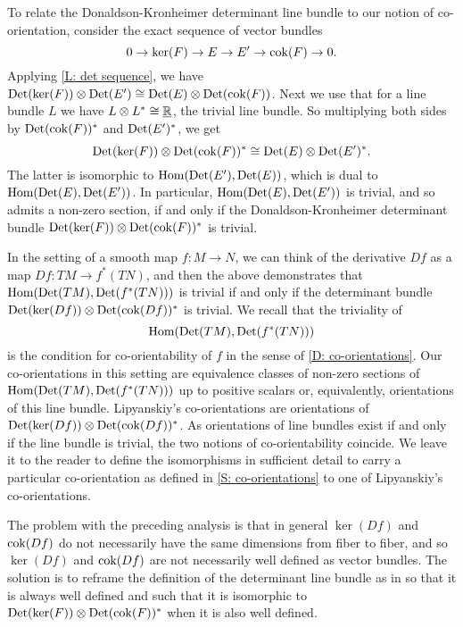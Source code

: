 To relate the Donaldson-Kronheimer determinant line bundle to our notion of co-orientation, consider the exact sequence of vector bundles
\begin{equation*}
	0 \to \ker(F) \to E \to E' \to {\rm cok}(F) \to 0.
\end{equation*}
Applying \cref{L: det sequence}, we have ${\rm Det}(\ker(F)) \otimes {\rm Det}(E') \cong {\rm Det}(E) \otimes {\rm Det}({\rm cok}(F))$.
Next we use that for a line bundle $L$ we have $L \otimes L^* \cong \underline{\mathbb{R}}$, the trivial line bundle.
So multiplying both sides by ${\rm Det}({\rm cok}(F))^*$ and ${\rm Det}(E')^*$, we get
$${\rm Det}(\ker(F)) \otimes {\rm Det}({\rm cok}(F))^* \cong {\rm Det}(E) \otimes {\rm Det}(E')^*.$$
The latter is isomorphic to $\textup{Hom}({\rm Det}(E'), {\rm Det}(E))$, which is dual to $\textup{Hom}({\rm Det}(E), {\rm Det}(E'))$.
In particular, $\textup{Hom}({\rm Det}(E), {\rm Det}(E'))$ is trivial, and so admits a non-zero section, if and only if the Donaldson-Kronheimer determinant bundle ${\rm Det}(\ker(F)) \otimes {\rm Det}({\rm cok}(F))^*$ is trivial.

In the setting of a smooth map $f \colon M \to N$, we can think of the derivative $Df$ as a map $Df \colon TM \to f^*(TN)$, and then the above demonstrates that $\textup{Hom}({\rm Det}(TM), {\rm Det}(f^*(TN)))$ is trivial if and only if the determinant bundle ${\rm Det}(\ker(Df)) \otimes {\rm Det}({\rm cok}(Df))^*$ is trivial.
We recall that the triviality of
\[
\textup{Hom}({\rm Det}(TM), {\rm Det}(f^*(TN)))
\]
is the condition for co-orientability of $f$ in the sense of \cref{D: co-orientations}.
Our co-orientations in this setting are equivalence classes of non-zero sections of $\textup{Hom}({\rm Det}(TM), {\rm Det}(f^*(TN)))$ up to positive scalars or, equivalently, orientations of this line bundle.
Lipyanskiy's co-orientations are orientations of ${\rm Det}(\ker(Df)) \otimes {\rm Det}({\rm cok}(Df))^*$.
As orientations of line bundles exist if and only if the line bundle is trivial, the two notions of co-orientability coincide.
We leave it to the reader to define the isomorphisms in sufficient detail to carry a particular co-orientation as defined in \cref{S: co-orientations} to one of Lipyanskiy's co-orientations.

The problem with the preceding analysis is that in general $\ker(Df)$ and ${\rm cok}(Df)$ do not necessarily have the same dimensions from fiber to fiber, and so $\ker(Df)$ and ${\rm cok}(Df)$ are not necessarily well defined as vector bundles.
The solution is to reframe the definition of the determinant line bundle as in \cite{DoKr90} so that it is always well defined and such that it is isomorphic to ${\rm Det}(\ker(F)) \otimes {\rm Det}({\rm cok}(F))^*$ when it is also well defined.

